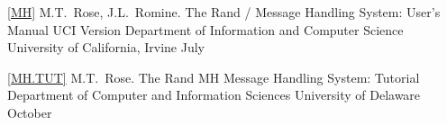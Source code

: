 \let\journalinfo=\jourinfo
\let\thesis=\book			%
\let\thesisinfo=\bookinfo		%


\ref{MH}
\by M.T.~Rose, J.L.~Romine.
\paper The Rand \MH/ Message Handling System: User's Manual
\paperinfo UCI Version
\other
\publ Department of Information and Computer Science
\publaddr University of California, Irvine
\month July
\endref

\ref{MH.TUT}
\by M.T.~Rose.
\paper The Rand MH Message Handling System: Tutorial
\other
\publ Department of Computer and Information Sciences
\publaddr University of Delaware
\month October
\endref

\endreferences
